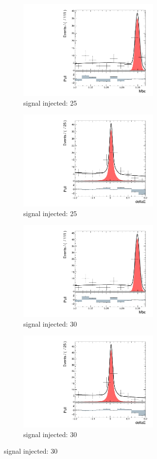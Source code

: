 \begin{figure}[H]
	\begin{subfigure}{0.5\linewidth}
		\includegraphics[page=1,height=5cm]{figures/injection_sig_25/ds_gen_Mbc_2D.pdf}
		\caption{signal injected: 25}
	\end{subfigure}
	\begin{subfigure}{0.5\linewidth}
		\includegraphics[page=1,height=5cm]{figures/injection_sig_25/ds_gen_deltaE_2D.pdf}
		\caption{signal injected: 25}
	\end{subfigure}
	\begin{subfigure}{0.5\linewidth}
		\includegraphics[page=1,height=5cm]{figures/injection_sig_30/ds_gen_Mbc_2D.pdf}
		\caption{signal injected: 30}
	\end{subfigure}
	\begin{subfigure}{0.5\linewidth}
		\includegraphics[page=1,height=5cm]{figures/injection_sig_30/ds_gen_deltaE_2D.pdf}
		\caption{signal injected: 30}
	\end{subfigure}
\end{figure}


